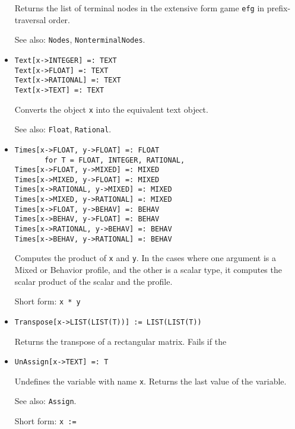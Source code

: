 \begin{itemize}
\bd
Returns the list of terminal nodes in the extensive form
game \verb+efg+ in prefix-traversal order.
\item
[See also:] {\tt Nodes}, {\tt NonterminalNodes}.
\ed

\item
\protect \large \begin{verbatim}
Text[x->INTEGER] =: TEXT
Text[x->FLOAT] =: TEXT
Text[x->RATIONAL] =: TEXT
Text[x->TEXT] =: TEXT
\end{verbatim} \normalsize

\bd
Converts the object \verb+x+ into the equivalent text object.
\item
[See also:] {\tt Float}, {\tt Rational}.
\ed

\item 
\protect \large \begin{verbatim}
Times[x->FLOAT, y->FLOAT] =: FLOAT
       for T = FLOAT, INTEGER, RATIONAL,
Times[x->FLOAT, y->MIXED] =: MIXED
Times[x->MIXED, y->FLOAT] =: MIXED
Times[x->RATIONAL, y->MIXED] =: MIXED
Times[x->MIXED, y->RATIONAL] =: MIXED
Times[x->FLOAT, y->BEHAV] =: BEHAV
Times[x->BEHAV, y->FLOAT] =: BEHAV
Times[x->RATIONAL, y->BEHAV] =: BEHAV
Times[x->BEHAV, y->RATIONAL] =: BEHAV
\end{verbatim} \normalsize
  
\bd
Computes the product of \verb+x+ and \verb+y+.  In the cases where one
argument is a Mixed or Behavior profile, and the other is a scalar
type, it computes the scalar product of the scalar and the profile. 
\item
[Short form:] \verb+x * y+
\ed

\item
\protect \large \begin{verbatim} 
Transpose[x->LIST(LIST(T))] := LIST(LIST(T))
\end{verbatim}\normalsize

\bd
Returns the transpose of a rectangular matrix. Fails if the 
\ed




\item
\protect \large \begin{verbatim}
UnAssign[x->TEXT] =: T
\end{verbatim}\normalsize

\bd
Undefines the variable with name \verb+x+.  Returns the
last value of the variable.
\item
[See also:] {\tt Assign}.
\item
[Short form:] \verb+x :=+
\ed


\end{itemize}
